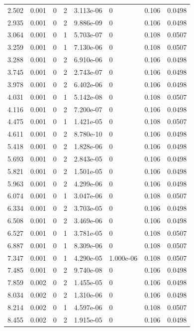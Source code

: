 \documentclass[preview]{standalone}
\begin{document}
{{\begin{tabular}{L{1.2cm}C{1.2cm} C{0.3cm}C{0.5cm} C{1.4cm}C{1.4cm} C{1.4cm}C{1.4cm}}
  2.502  &  0.001  & 0     &  2 &  3.113e-06  & 0  & 0.106 &  0.0498   \\ 
  2.935  &  0.001  & 0     &  2 &  9.886e-09  & 0  & 0.106 &  0.0498   \\ 
  3.064  &  0.001  & 0     &  1 &  5.703e-07  & 0  & 0.108 &  0.0507   \\ 
  3.259  &  0.001  & 0     &  1 &  7.130e-06  & 0  & 0.108 &  0.0507   \\ 
  3.288  &  0.001  & 0     &  2 &  6.910e-06  & 0  & 0.106 &  0.0498   \\ 
  3.745  &  0.001  & 0     &  2 &  2.743e-07  & 0  & 0.106 &  0.0498   \\ 
  3.978  &  0.001  & 0     &  2 &  6.402e-06  & 0  & 0.106 &  0.0498   \\ 
  4.031  &  0.001  & 0     &  1 &  5.142e-08  & 0  & 0.108 &  0.0507   \\ 
  4.116  &  0.001  & 0     &  2 &  7.200e-07  & 0  & 0.106 &  0.0498   \\ 
  4.475  &  0.001  & 0     &  1 &  1.421e-05  & 0  & 0.108 &  0.0507   \\ 
  4.611  &  0.001  & 0     &  2 &  8.780e-10  & 0  & 0.106 &  0.0498   \\ 
  5.418  &  0.001  & 0     &  2 &  1.828e-06  & 0  & 0.106 &  0.0498   \\ 
  5.693  &  0.001  & 0     &  2 &  2.843e-05  & 0  & 0.106 &  0.0498   \\ 
  5.821  &  0.001  & 0     &  2 &  1.501e-05  & 0  & 0.106 &  0.0498   \\ 
  5.963  &  0.001  & 0     &  2 &  4.299e-06  & 0  & 0.106 &  0.0498   \\ 
  6.074  &  0.001  & 0     &  1 &  3.047e-06  & 0  & 0.108 &  0.0507   \\ 
  6.334  &  0.001  & 0     &  2 &  3.703e-05  & 0  & 0.106 &  0.0498   \\ 
  6.508  &  0.001  & 0     &  2 &  3.469e-06  & 0  & 0.106 &  0.0498   \\ 
  6.527  &  0.001  & 0     &  1 &  3.781e-05  & 0  & 0.108 &  0.0507   \\ 
  6.887  &  0.001  & 0     &  1 &  8.309e-06  & 0  & 0.108 &  0.0507   \\ 
  7.347  &  0.001  & 0     &  1 &  4.290e-05  & 1.000e-06  & 0.108 &  0.0507   \\ 
  7.485  &  0.001  & 0     &  2 &  9.740e-08  & 0  & 0.106 &  0.0498   \\ 
  7.859  &  0.002  & 0     &  2 &  1.455e-05  & 0  & 0.106 &  0.0498   \\ 
  8.034  &  0.002  & 0     &  2 &  1.310e-06  & 0  & 0.106 &  0.0498   \\ 
  8.214  &  0.002  & 0     &  1 &  4.597e-06  & 0  & 0.108 &  0.0507   \\ 
  8.455  &  0.002  & 0     &  2 &  1.915e-05  & 0  & 0.106 &  0.0498   \\ 
\hline 
\end{tabular} 

}}
\end{document}
